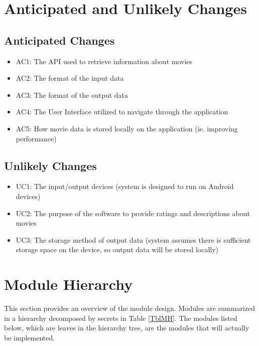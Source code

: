 \documentclass[12pt, titlepage]{article}
\begin{document}
\section{Anticipated and Unlikely Changes} \label{SecChange}
\subsection{Anticipated Changes} \label{SecAchange}
\begin{itemize}
	\item AC1: The API used to retrieve information about movies 
	\item AC2: The format of the input data
	\item AC3: The format of the output data
	\item AC4: The User Interface utilized to navigate through the application
	\item AC5: How movie data is stored locally on the application (ie. improving performance)
\end{itemize}

\subsection{Unlikely Changes} \label{SecUchange}
\begin{itemize}
	\item UC1: The input/output devices (system is designed to run on Android devices) 
	\item UC2: The purpose of the software to provide ratings and descriptions about movies
	\item UC3: The storage method of output data (system assumes there is sufficient storage space on the device, so output data will be stored locally)
\end{itemize}

\section{Module Hierarchy} \label{SecMH}
This section provides an overview of the module design. Modules are summarized
in a hierarchy decomposed by secrets in Table \ref{TblMH}. The modules listed
below, which are leaves in the hierarchy tree, are the modules that will
actually be implemented.
\end{document}
